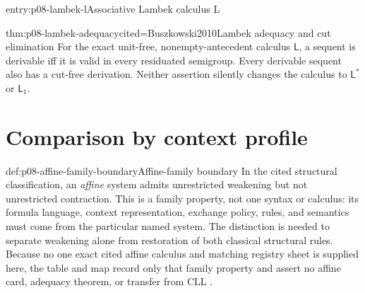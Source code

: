 \begin{systementry}{entry:p08-lambek-l}{Associative Lambek calculus L}
\end{systementry}

\begin{hbtheorem}{thm:p08-lambek-adequacy}{cited=Buszkowski2010}{Lambek adequacy and cut elimination}
For the exact unit-free, nonempty-antecedent calculus
\hyperref[sheet:lambek-l]{\(\mathsf L\)}, a sequent is derivable iff it is
valid in every residuated semigroup.  Every derivable sequent also has a
cut-free derivation.  Neither assertion silently changes the calculus to
\(\mathsf L^*\) or \(\mathsf L_1\).
\end{hbtheorem}

\section{Comparison by context profile}

\begin{proofboundary}{def:p08-affine-family-boundary}{Affine-family boundary}
In the cited structural classification, an \emph{affine} system admits
unrestricted weakening but not unrestricted contraction.  This is a family
property, not one syntax or calculus: its formula language, context
representation, exchange policy, rules, and semantics must come from the
particular named system.  The distinction is needed to separate weakening
alone from restoration of both classical structural rules.  Because no one
exact cited affine calculus and matching registry sheet is supplied here, the
table and map record only that family property and assert no affine card,
adequacy theorem, or transfer from CLL \cite{Girard1995}.
\end{proofboundary}

